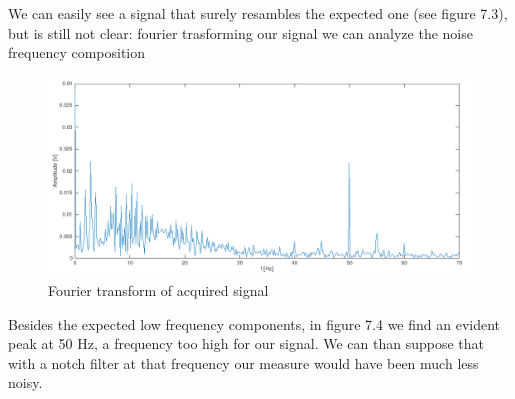We can easily see a signal that surely resambles the expected one (see figure 7.3), but is still  not clear: fourier trasforming our signal we can analyze the noise frequency composition
\begin{figure}[H]
\centering
\includegraphics[width=.7\textwidth]{8/fft.png}
\caption{Fourier transform of acquired signal}
\end{figure}
Besides the expected low frequency components, in figure 7.4 we find an evident peak at 50 Hz, a frequency too high for our signal. We can than suppose that with a notch filter at that frequency our measure would have been much less noisy.
